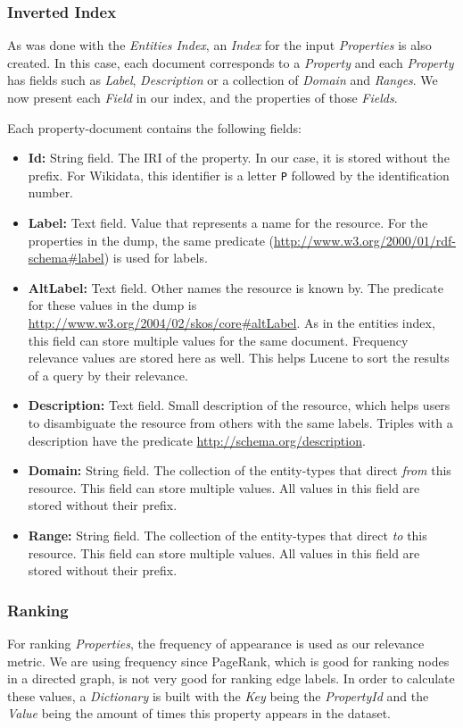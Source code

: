 \subsubsection{Inverted Index}
As  was done with the \textit{Entities Index}, an \textit{Index} for the input \textit{Properties} is also created. In this case, each document corresponds to a \textit{Property} and each \textit{Property} has fields such as \textit{Label}, \textit{Description} or a collection of \textit{Domain} and \textit{Ranges}. 
We now present each \textit{Field} in our index, and the properties of those \textit{Fields}.

Each property-document contains the following fields:
\begin{itemize}
    \item \textbf{Id:} String field. The IRI of the property. In our case, it is  stored without the prefix. For Wikidata, this identifier is a letter \texttt{P} followed by the identification number.
    \item \textbf{Label:} Text field.  Value that represents a name for the resource.  For the properties in the dump, the same predicate (\url{http://www.w3.org/2000/01/rdf-schema#label}) is used for labels. 
    \item \textbf{AltLabel:} Text field. Other names the resource is known by. The predicate for these values in the dump is \url{http://www.w3.org/2004/02/skos/core#altLabel}. As in the entities index, this field can store multiple values for the same document. Frequency relevance values are stored here as well. This helps Lucene to sort the results of a query by their relevance.
    \item \textbf{Description:} Text field. Small description of the resource, which helps users to disambiguate the resource from others with the same labels. Triples with a description have the predicate \url{http://schema.org/description}.
    \item \textbf{Domain:} String field. The collection of the entity-types that direct \textit{from} this resource. This field can store multiple values. All values in this field are stored without their prefix.
    \item \textbf{Range:} String field. The collection of the entity-types that direct \textit{to} this resource. This field can store multiple values. All values in this field are stored without their prefix.
\end{itemize}

\subsubsection{Ranking}
For ranking \textit{Properties}, the frequency of appearance is used as our relevance metric. 
We are using frequency since PageRank, which is good for ranking nodes in a directed graph, is not very good for ranking edge labels.
In order to calculate these values, a \textit{Dictionary} is built with the \textit{Key} being the \textit{PropertyId} and the \textit{Value} being the amount of times this property appears in the dataset.

